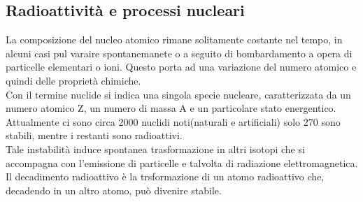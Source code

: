 \subsection{Radioattività e processi nucleari}
La composizione del nucleo atomico rimane solitamente costante nel tempo, in alcuni casi pul varaire spontanemanete o a seguito di bombardamento a opera di particelle elementari o ioni. Questo porta ad una variazione del numero atomico e quindi delle proprietà chimiche.\\
Con il termine nuclide si indica una singola specie nucleare, caratterizzata da un numero atomico Z, un numero di massa A e un particolare stato energentico.\\
Attualmente ci sono circa 2000 nuclidi noti(naturali e artificiali) solo 270 sono stabili, mentre i restanti sono radioattivi.\\
Tale instabilità induce spontanea trasformazione in altri isotopi che si accompagna con l'emissione di particelle e talvolta di radiazione elettromagnetica.\\
Il decadimento radioattivo è la trsformazione di un atomo radioattivo che, decadendo in un altro atomo, può divenire stabile.\\
